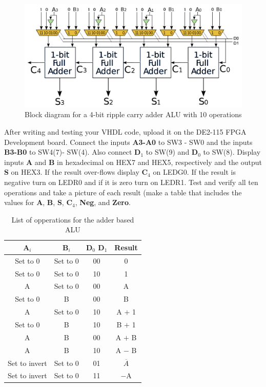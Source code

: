 \begin{figure}[H]
	\centering
	\includegraphics[width=150mm]{Lab3/figures/fulladderalu.png}
	\caption{Block diagram for a 4-bit ripple carry adder ALU with 10 operations}
	\label{fig:fulladderalu}
\end{figure}

After writing and testing your VHDL code, upload it on the DE2-115 FPGA Development board. Connect the inputs {\bf A3-A0} to SW3 - SW0 and the inputs {\bf B3-B0} to SW4(7)- SW(4). Also connect {\bf D$_1$} to SW(9) and {\bf D$_0$} to SW(8). Display inputs {\bf A} and {\bf B} in hexadecimal on HEX7 and HEX5, respectively and the output {\bf S} on HEX3. If the result over-flows display {\bf C$_4$} on LEDG0. If the result is negative turn on LEDR0 and if it is zero turn on LEDR1. Test and verify all ten operations and take a picture of each result (make a table that includes the values for {\bf A}, {\bf B}, {\bf S}, {\bf C$_4$}, {\bf Neg}, and {\bf Zero}.

\begin{table}[H]
	\centering
	\caption{List of opperations for the adder based ALU}
	\begin{tabular}{ | c | c | c | c | }
		\hline                        
 		\bf A$_i$ & \bf B$_i$ & \bf D$_0$ D$_1$ & \bf Result \\ \hline
 		Set to 0 & Set to 0 & 00 & 0 \\ \hline
 		Set to 0 &  Set to 0 &10 & 1 \\ \hline
 		A &  Set to 0 & 00 & A \\ \hline
 		Set to 0& B  & 00  & B  \\ \hline
 		A & Set to 0 & 10 & A $+$ 1 \\ \hline
 		Set to 0 & B & 10 & B $+$ 1 \\ \hline
 		A & B & 00 & A $+$ B \\ \hline
 		A & B & 10 & A $-$ B \\ \hline
 		Set to invert & Set to 0 & 01 & $\overline{A}$ \\ \hline
 		Set to invert & Set to 0 & 11 & $-$A \\ 
 		\hline
	\end{tabular}
	\label{tab:adderaluop}
\end{table}

